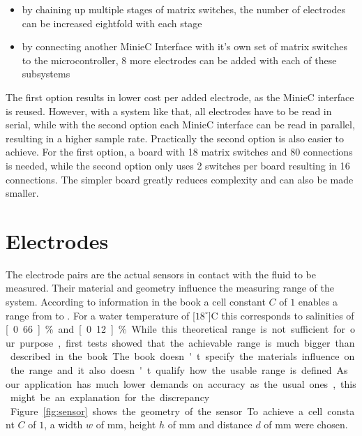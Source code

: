\begin{itemize}
    \item by chaining up multiple stages of matrix switches, the number of electrodes can be increased eightfold with each stage
    \item by connecting another MinieC Interface with it's own set of matrix switches to the microcontroller, 8 more electrodes can be added with each of these subsystems
\end{itemize}

The first option results in lower cost per added electrode, as the MinieC interface is reused. However, with a system like that, all electrodes have to be read in serial, while with the second option each MinieC interface can be read in parallel, resulting in a higher sample rate. Practically the second option is also easier to achieve. For the first option, a board with 18 matrix switches and 80 connections is needed, while the second option only uses 2 switches per board resulting in 16 connections. The simpler board greatly reduces complexity and can also be made smaller.

\section{Electrodes}

The electrode pairs are the actual sensors in contact with the fluid to be measured. Their material and geometry influence the measuring range of the system. According to information in the book \cite{trankler2015sensortechnik} a cell constant $ C $ of $1$ enables a range from  to . For a water temperature of \unit[$18^\circ$]{C} this corresponds to salinities of \unit[0.66]{\%} and \unit[0.12]{\%}. While this theoretical range is not sufficient for our purpose, first tests showed that the achievable range is much bigger than described in the book. The book doesn't specify the materials influence on the range and it also doesn't qualify how the usable range is defined. As our application has much lower demands on accuracy as the usual ones, this might be an explanation for the discrepancy. \\

Figure \ref{fig:sensor} shows the geometry of the sensor. To achieve a cell constant $C$ of $1$, a width $w$ of \unit[1]{mm}, height $h$ of \unit[10]{mm} and distance $d$ of \unit[10]{mm} were chosen.\\

